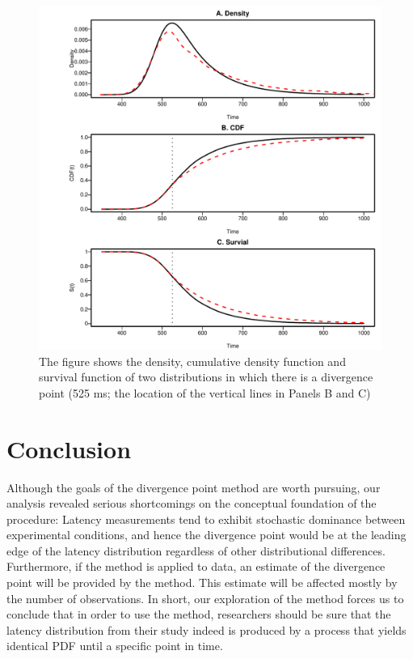 \documentclass[man]{apa}%
\begin{document}
\begin{figure}[h] %
	\includegraphics[width=5in]{contrived.pdf}
	\caption{The figure shows the density, cumulative density function and survival function of two distributions in which there is a divergence point (525 ms; the location of the vertical lines in Panels B and C)}
		\label{fig:contrived}
\end{figure}
  


 
            
  
\section{Conclusion}

Although the goals of the divergence point method are worth pursuing, our analysis revealed serious shortcomings on the conceptual foundation of the procedure:  Latency measurements tend to exhibit stochastic dominance between experimental conditions, and hence the divergence point would be at the leading edge of the latency distribution regardless of other distributional differences.  Furthermore, if the method is applied to data, an estimate of the divergence point will be provided by the method. This estimate will be affected mostly by the number of observations. In short, our exploration of the method forces us to conclude that in order to use the method, researchers should be sure that the latency distribution from their study indeed is produced by a process that yields identical PDF until a specific point in time. 
\end{document}
